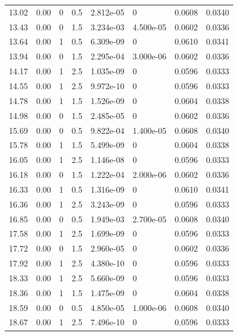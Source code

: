 \documentclass[preview]{standalone}
\begin{document}
{{{\begin{tabular}{L{1.2cm}C{1.2cm} C{0.3cm}C{0.5cm} C{1.4cm}C{1.4cm} C{1.4cm}C{1.4cm}}
  13.02  &  0.00  & 0     & 0.5 &  2.812e-05  & 0  & 0.0608 &  0.0340   \\ 
  13.43  &  0.00  & 0     & 1.5 &  3.234e-03  & 4.500e-05  & 0.0602 &  0.0336   \\ 
  13.64  &  0.00  & 1     & 0.5 &  6.309e-09  & 0  & 0.0610 &  0.0341   \\ 
  13.94  &  0.00  & 0     & 1.5 &  2.295e-04  & 3.000e-06  & 0.0602 &  0.0336   \\ 
  14.17  &  0.00  & 1     & 2.5 &  1.035e-09  & 0  & 0.0596 &  0.0333   \\ 
  14.55  &  0.00  & 1     & 2.5 &  9.972e-10  & 0  & 0.0596 &  0.0333   \\ 
  14.78  &  0.00  & 1     & 1.5 &  1.526e-09  & 0  & 0.0604 &  0.0338   \\ 
  14.98  &  0.00  & 0     & 1.5 &  2.485e-05  & 0  & 0.0602 &  0.0336   \\ 
  15.69  &  0.00  & 0     & 0.5 &  9.822e-04  & 1.400e-05  & 0.0608 &  0.0340   \\ 
  15.78  &  0.00  & 1     & 1.5 &  5.499e-09  & 0  & 0.0604 &  0.0338   \\ 
  16.05  &  0.00  & 1     & 2.5 &  1.146e-08  & 0  & 0.0596 &  0.0333   \\ 
  16.18  &  0.00  & 0     & 1.5 &  1.222e-04  & 2.000e-06  & 0.0602 &  0.0336   \\ 
  16.33  &  0.00  & 1     & 0.5 &  1.316e-09  & 0  & 0.0610 &  0.0341   \\ 
  16.36  &  0.00  & 1     & 2.5 &  3.243e-09  & 0  & 0.0596 &  0.0333   \\ 
  16.85  &  0.00  & 0     & 0.5 &  1.949e-03  & 2.700e-05  & 0.0608 &  0.0340   \\ 
  17.58  &  0.00  & 1     & 2.5 &  1.699e-09  & 0  & 0.0596 &  0.0333   \\ 
  17.72  &  0.00  & 0     & 1.5 &  2.960e-05  & 0  & 0.0602 &  0.0336   \\ 
  17.92  &  0.00  & 1     & 2.5 &  4.380e-10  & 0  & 0.0596 &  0.0333   \\ 
  18.33  &  0.00  & 1     & 2.5 &  5.660e-09  & 0  & 0.0596 &  0.0333   \\ 
  18.36  &  0.00  & 1     & 1.5 &  1.475e-09  & 0  & 0.0604 &  0.0338   \\ 
  18.59  &  0.00  & 0     & 0.5 &  4.850e-05  & 1.000e-06  & 0.0608 &  0.0340   \\ 
  18.67  &  0.00  & 1     & 2.5 &  7.496e-10  & 0  & 0.0596 &  0.0333   \\ 

\end{tabular}}}}
\end{document}

